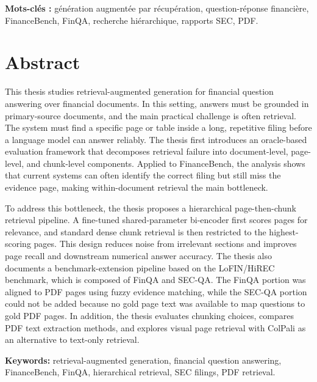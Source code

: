 \documentclass[12pt,twoside,maitrise]{dms}
\theoremstyle{definition}
\numberwithin{equation}{section}
\numberwithin{table}{chapter}
\numberwithin{figure}{chapter}
\begin{document}
\textbf{Mots-cl\'es :} g\'en\'eration augment\'ee par r\'ecup\'eration,
question-r\'eponse financi\`ere, FinanceBench, FinQA, recherche hi\'erarchique,
rapports SEC, PDF.

\anglais
\chapter*{Abstract}
This thesis studies retrieval-augmented generation for financial question
answering over financial documents. In this setting, answers must be grounded in
primary-source documents, and the main practical challenge is often retrieval. The system must find a specific page or table inside a long, repetitive filing
before a language model can answer reliably. The thesis first introduces an
oracle-based evaluation framework that decomposes retrieval failure into
document-level, page-level, and chunk-level components. Applied to FinanceBench,
the analysis shows that current systems can often identify the correct filing
but still miss the evidence page, making within-document retrieval the main
bottleneck.

To address this bottleneck, the thesis proposes a hierarchical page-then-chunk
retrieval pipeline. A fine-tuned shared-parameter bi-encoder first scores pages
for relevance, and standard dense chunk retrieval is then restricted to the
highest-scoring pages. This design reduces noise from irrelevant sections and
improves page recall and downstream numerical answer accuracy. The thesis also
documents a benchmark-extension pipeline based on the LoFIN/HiREC benchmark,
which is composed of FinQA and SEC-QA. The FinQA portion was aligned to PDF
pages using fuzzy evidence matching, while the SEC-QA portion could not be added
because no gold page text was available to map questions to gold PDF pages. In
addition, the thesis evaluates chunking choices, compares PDF text extraction
methods, and explores visual page retrieval with ColPali as an alternative to
text-only retrieval.

\textbf{Keywords:} retrieval-augmented generation, financial question answering,
FinanceBench, FinQA, hierarchical retrieval, SEC filings, PDF retrieval.

\francais
\cleardoublepage
{}
\tableofcontents
\cleardoublepage
{}
\listoftables
\cleardoublepage
{}
\listoffigures

\anglais
\end{document}

